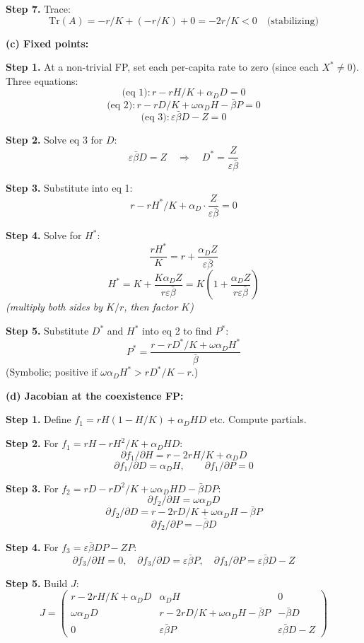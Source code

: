 \documentclass[10pt]{article}
\newcommand{\thus}{\quad\Longrightarrow\quad}
\newcommand{\stepwhy}[1]{\textcolor{blue!60!black}{\small\textit{(#1)}}}
\begin{document}
\begin{solution}
\textbf{Step 7.} Trace:
\[
\text{Tr}(A) = -r/K + (-r/K) + 0 = -2r/K < 0 \quad\text{(stabilizing)}
\]

\medskip\textbf{(c) Fixed points:}

\textbf{Step 1.} At a non-trivial FP, set each per-capita rate to zero (since each $X^* \neq 0$). Three equations:
\[
\text{(eq 1)}: r - rH/K + \alpha_D D = 0
\]
\[
\text{(eq 2)}: r - rD/K + \omega\alpha_D H - \bar\beta P = 0
\]
\[
\text{(eq 3)}: \varepsilon\bar\beta D - Z = 0
\]

\textbf{Step 2.} Solve eq 3 for $D$:
\[
\varepsilon\bar\beta D = Z \thus D^* = \frac{Z}{\varepsilon\bar\beta}
\]

\textbf{Step 3.} Substitute into eq 1:
\[
r - rH^*/K + \alpha_D\cdot\frac{Z}{\varepsilon\bar\beta} = 0
\]

\textbf{Step 4.} Solve for $H^*$:
\[
\frac{rH^*}{K} = r + \frac{\alpha_D Z}{\varepsilon\bar\beta}
\]
\[
H^* = K + \frac{K\alpha_D Z}{r\varepsilon\bar\beta} = K\left(1 + \frac{\alpha_D Z}{r\varepsilon\bar\beta}\right)
\]
\stepwhy{multiply both sides by $K/r$, then factor $K$}

\textbf{Step 5.} Substitute $D^*$ and $H^*$ into eq 2 to find $P^*$:
\[
P^* = \frac{r - rD^*/K + \omega\alpha_D H^*}{\bar\beta}
\]
(Symbolic; positive if $\omega\alpha_D H^* > rD^*/K - r$.)

\medskip\textbf{(d) Jacobian at the coexistence FP:}

\textbf{Step 1.} Define $f_1 = rH(1-H/K) + \alpha_D HD$ etc. Compute partials.

\textbf{Step 2.} For $f_1 = rH - rH^2/K + \alpha_D HD$:
\[
\partial f_1/\partial H = r - 2rH/K + \alpha_D D
\]
\[
\partial f_1/\partial D = \alpha_D H, \qquad \partial f_1/\partial P = 0
\]

\textbf{Step 3.} For $f_2 = rD - rD^2/K + \omega\alpha_D HD - \bar\beta DP$:
\[
\partial f_2/\partial H = \omega\alpha_D D
\]
\[
\partial f_2/\partial D = r - 2rD/K + \omega\alpha_D H - \bar\beta P
\]
\[
\partial f_2/\partial P = -\bar\beta D
\]

\textbf{Step 4.} For $f_3 = \varepsilon\bar\beta DP - ZP$:
\[
\partial f_3/\partial H = 0, \quad \partial f_3/\partial D = \varepsilon\bar\beta P, \quad \partial f_3/\partial P = \varepsilon\bar\beta D - Z
\]

\textbf{Step 5.} Build $J$:
\[
J = \begin{pmatrix} r - 2rH/K + \alpha_D D & \alpha_D H & 0 \\ \omega\alpha_D D & r - 2rD/K + \omega\alpha_D H - \bar\beta P & -\bar\beta D \\ 0 & \varepsilon\bar\beta P & \varepsilon\bar\beta D - Z \end{pmatrix}
\]


\end{solution}
\end{document}
